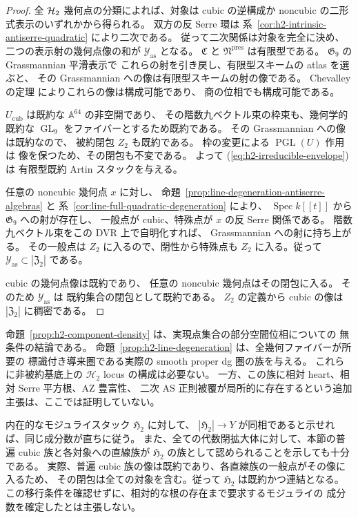 \begin{proof}
全 $\mathcal H_2$ 幾何点の分類によれば、対象は
cubic の逆構成か noncubic の二形式表示のいずれかから得られる。
双方の反 Serre 環は
系~\ref{cor:h2-intrinsic-antiserre-quadratic} により二次である。
従って二次関係は対象を完全に決め、
二つの表示射の幾何点像の和が
$\mathcal Y_{\mathrm{as}}$ となる。
$\mathfrak C$ と $\mathfrak N^{\mathrm{pres}}$ は有限型である。
$\mathfrak G_9$ の Grassmannian 平滑表示で
これらの射を引き戻し、有限型スキームの atlas を選ぶと、
その Grassmannian への像は有限型スキームの射の像である。
Chevalley の定理
\cite[Tag 054K]{StacksModuli} によりこれらの像は構成可能であり、
商の位相でも構成可能である。

$U_{\mathrm{cub}}$ は既約な $\mathbb A^{64}$ の非空開であり、
その階数九ベクトル束の枠束も、幾何学的既約な
$\operatorname{GL}_9$ をファイバーとするため既約である。
その Grassmannian への像は既約なので、
被約閉包 $Z_2$ も既約である。
枠の変更による $\operatorname{PGL}(U)$ 作用は
像を保つため、その閉包も不変である。
よって (\ref{eq:h2-irreducible-envelope}) は
有限型既約 Artin スタックを与える。

任意の noncubic 幾何点 $x$ に対し、
命題~\ref{prop:line-degeneration-antiserre-algebras} と
系~\ref{cor:line-full-quadratic-degeneration} により、
$\operatorname{Spec}k[[t]]$ から $\mathfrak G_9$ への射が存在し、
一般点が cubic、特殊点が $x$ の反 Serre 関係である。
階数九ベクトル束をこの DVR 上で自明化すれば、
Grassmannian への射に持ち上がる。
その一般点は $Z_2$ に入るので、閉性から特殊点も
$Z_2$ に入る。従って
$\mathcal Y_{\mathrm{as}}\subset|\mathfrak Z_2|$ である。

cubic の幾何点像は既約であり、
任意の noncubic 幾何点はその閉包に入る。
そのため $\mathcal Y_{\mathrm{as}}$ は
既約集合の閉包として既約である。
$Z_2$ の定義から cubic の像は
$|\mathfrak Z_2|$ に稠密である。
\end{proof}

\begin{remark}[内在的な相対モジュライへの移行条件]
命題~\ref{prop:h2-component-density} は、実現点集合の部分空間位相についての
無条件の結論である。
命題~\ref{prop:h2-line-degeneration} は、全幾何ファイバーが所要の
標識付き導来圏である実際の smooth proper dg 圏の族を与える。
これらに非被約基底上の $\mathcal H_2$ locus の構成は必要ない。
一方、この族に相対 heart、相対 Serre 平方根、AZ 豊富性、
二次 AS 正則被覆が局所的に存在するという追加主張は、ここでは証明していない。

内在的なモジュライスタック $\mathfrak H_2$ に対して、
$|\mathfrak H_2|\to Y$ が同相であると示せれば、同じ成分数が直ちに従う。
また、全ての代数閉拡大体に対して、本節の普遍 cubic 族と各対象への直線族が
$\mathfrak H_2$ の族として認められることを示しても十分である。
実際、普遍 cubic 族の像は既約であり、各直線族の一般点がその像に入るため、
その閉包は全ての対象を含む。従って $\mathfrak H_2$ は既約かつ連結となる。
この移行条件を確認せずに、相対的な根の存在まで要求するモジュライの
成分数を確定したとは主張しない。
\end{remark}

